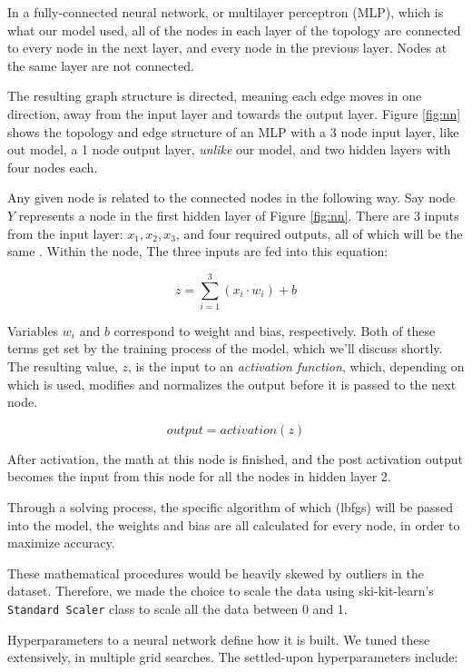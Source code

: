 \documentclass[10pt,sigconf,letterpaper,nonacm]{acmart}
\begin{document}
In a fully-connected neural network, or multilayer perceptron (MLP), which is what our model used, all of the nodes in each layer of the topology are connected to every node in the next layer, and every node in the previous layer. Nodes at the same layer are not connected.

The resulting graph structure is directed, meaning each edge moves in one direction, away from the input layer and towards the output layer. Figure 
\ref{fig:nn}
shows the topology and edge structure of an MLP with a 3 node input layer, like out model, a 1 node output layer, {\it unlike} our model, and two hidden layers with four nodes each.

Any given node is related to the connected nodes in the following way.
Say node $Y$ represents a node in the first hidden layer of Figure \ref{fig:nn}.
There are 3 inputs from the input layer: $x_1, x_2, x_3$, and four required outputs, all of which will be the same . Within the node, The three inputs are fed into this equation:

$$z = \sum_{i=1}^3(x_i \cdot w_i) + b$$

Variables $w_i$ and $b$ correspond to weight and bias, respectively. Both of these terms get set by the training process of the model, which we'll discuss shortly. 
The resulting value, $z$, is the input to an {\it activation function}, which, depending on which is used, modifies and normalizes the output before it is passed to the next node. 

$$output = activation(z)$$

After activation, the math at this node is finished, and the post activation output becomes the input from this node for all the nodes in hidden layer 2.

Through a solving process, the specific algorithm of which (lbfgs) will be passed into the model, 
the weights and bias are all calculated for every node, in order to maximize accuracy.

These mathematical procedures would be heavily skewed by outliers in the dataset. Therefore, we made the choice to scale the data using ski-kit-learn's \texttt{Standard Scaler} class to scale all the data between 0 and 1.

Hyperparameters to a neural network define how it is built. We tuned these extensively, in multiple grid searches. The settled-upon hyperparameters include:
\end{document}
